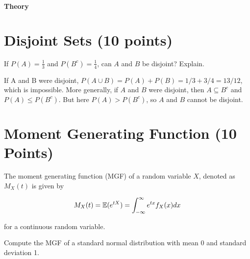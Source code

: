 \documentclass[12pt, xcolor=dvipsnames,svgnames,x11names]{article}
\makeatletter
\newenvironment{multiequation}[1][]{%
\begin{equation}%
   \begin{aligned}%
   \ifx#1\@empty\else\label{#1}\fi%
}{%
   \end{aligned}%
\end{equation}%
}
\makeatother
\begin{document}


{{\LARGE \textbf{Theory}}}

 \section{Disjoint Sets (10 points)}
    If $P(A) = \tfrac{1}{3}$ and $P(B^c) = \frac{1}{4}$, can $A$ and $B$ be disjoint? Explain.

    \begin{answerbox}
        If A and B were disjoint, $P(A \cup B) =
        P(A) + P(B) = 1/3 + 3/4 = 13/12$, which is impossible. More generally, if $A$ and
        $B$ were disjoint, then $A \subseteq B^c$ and $P(A) \leq P(B^c
        )$. But here $P(A) > P(B^c
        )$, so $A$
        and $B$ cannot be disjoint.
    \end{answerbox}


\section{Moment Generating Function (10 Points)}

The moment generating function (MGF) of a random variable $X$, denoted as $M_X(t)$ is given by 

\begin{multiequation}
M_X(t) = \Ebb(e^{tX}) = \int_{-\infty}^\infty e^{tx}f_X(x)dx
\end{multiequation}

for a continuous random variable.

Compute the MGF of a standard normal distribution with mean 0 and standard deviation 1.
\end{document}
